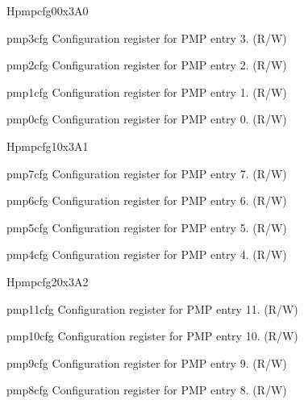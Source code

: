 \begin{register}{H}{pmpcfg0}{0x3A0}
\label{regdesc:lppmpcfg0}%
%
%
%
%
\regnewline%
\begin{regdesc}
\begin{reglist}
\label{fielddesc:lppmp3cfg}\item [pmp3cfg] Configuration register for PMP entry 3. (R/W)
\label{fielddesc:lppmp2cfg}\item [pmp2cfg] Configuration register for PMP entry 2. (R/W)
\label{fielddesc:lppmp1cfg}\item [pmp1cfg] Configuration register for PMP entry 1. (R/W)
\label{fielddesc:lppmp0cfg}\item [pmp0cfg] Configuration register for PMP entry 0. (R/W)
\end{reglist}
\end{regdesc}
\end{register}

\begin{register}{H}{pmpcfg1}{0x3A1}
\label{regdesc:lppmpcfg1}%
%
%
%
%
\regnewline%
\begin{regdesc}
\begin{reglist}
\label{fielddesc:lppmp7cfg}\item [pmp7cfg] Configuration register for PMP entry 7. (R/W)
\label{fielddesc:lppmp6cfg}\item [pmp6cfg] Configuration register for PMP entry 6. (R/W)
\label{fielddesc:lppmp5cfg}\item [pmp5cfg] Configuration register for PMP entry 5. (R/W)
\label{fielddesc:lppmp4cfg}\item [pmp4cfg] Configuration register for PMP entry 4. (R/W)
\end{reglist}
\end{regdesc}
\end{register}

\begin{register}{H}{pmpcfg2}{0x3A2}
\label{regdesc:lppmpcfg2}%
%
%
%
%
\regnewline%
\begin{regdesc}
\begin{reglist}
\label{fielddesc:lppmp11cfg}\item [pmp11cfg] Configuration register for PMP entry 11. (R/W)
\label{fielddesc:lppmp10cfg}\item [pmp10cfg] Configuration register for PMP entry 10. (R/W)
\label{fielddesc:lppmp9cfg}\item [pmp9cfg] Configuration register for PMP entry 9. (R/W)
\label{fielddesc:lppmp8cfg}\item [pmp8cfg] Configuration register for PMP entry 8. (R/W)
\end{reglist}
\end{regdesc}
\end{register}


